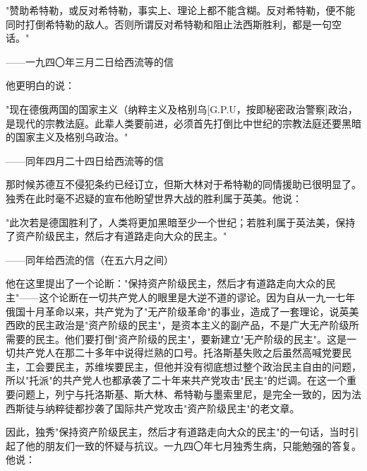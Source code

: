 \documentclass[
  openany,           %
  12pt,              %
  a4paper            %
]{ctexbook}
\newcommand{\fang}{\CJKfamily{fang}}
\newenvironment{quoteindent}
  {\list{}{\leftmargin=4em\rightmargin=0pt}\item\relax\fang\small}
  {\endlist}
\begin{document}
\begin{quoteindent}
"赞助希特勒，或反对希特勒，事实上、理论上都不能含糊。反对希特勒，便不能同时打倒希特勒的敌人。否则所谓反对希特勒和阻止法西斯胜利，都是一句空话。"
\end{quoteindent}

\hfill ——一九四〇年三月二日给西流等的信

他更明白的说：

\begin{quoteindent}
"现在德俄两国的国家主义（纳粹主义及格别乌[G.P.U，按即秘密政治警察]政治，是现代的宗教法庭。此辈人类要前进，必须首先打倒比中世纪的宗教法庭还要黑暗的国家主义及格别乌政治。"
\end{quoteindent}

\hfill ——同年四月二十四日给西流等的信

那时候苏德互不侵犯条约已经订立，但斯大林对于希特勒的同情援助已很明显了。独秀在此时毫不迟疑的宣布他盼望世界大战的胜利属于英美。他说：

\begin{quoteindent}
"此次若是德国胜利了，人类将更加黑暗至少一个世纪；若胜利属于英法美，保持了资产阶级民主，然后才有道路走向大众的民主。"
\end{quoteindent}

\hfill ——同年给西流的信（在五六月之间）

他在这里提出了一个论断："保持资产阶级民主，然后才有道路走向大众的民主"——这个论断在一切共产党人的眼里是大逆不道的谬论。因为自从一九一七年俄国十月革命以来，共产党为了"无产阶级革命"的事业，造成了一套理论，说英美西欧的民主政治是"资产阶级的民主"，是资本主义的副产品，不是广大无产阶级所需要的民主。他们要打倒"资产阶级的民主"，要新建立"无产阶级的民主"。这是一切共产党人在那二十多年中说得烂熟的口号。托洛斯基失败之后虽然高喊党要民主，工会要民主，苏维埃要民主，但他并没有彻底想过整个政治民主自由的问题，所以"托派"的共产党人也都承袭了二十年来共产党攻击"民主"的烂调。在这一个重要问题上，列宁与托洛斯基、斯大林、希特勒与墨索里尼，是完全一致的，因为法西斯徒与纳粹徒都抄袭了国际共产党攻击"资产阶级民主"的老文章。

因此，独秀"保持资产阶级民主，然后才有道路走向大众的民主"的一句话，当时引起了他的朋友们一致的怀疑与抗议。一九四〇年七月独秀生病，只能勉强的答复。他说：
\end{document}
